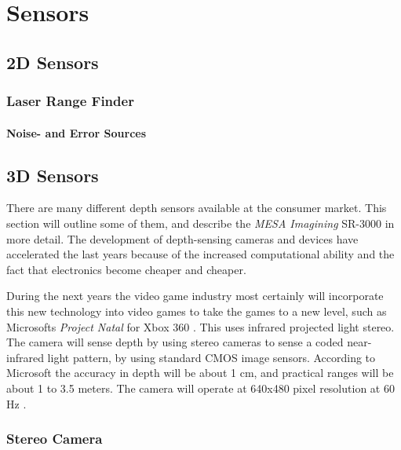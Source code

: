 

\chapter{Sensors}
\label{chap3-sensors}

\section{2D Sensors}

\subsection{Laser Range Finder}


\subsubsection{Noise- and Error Sources}



\section{3D Sensors}
There are many different depth sensors available at the consumer market. This section will
outline some of them, and describe the \emph{MESA Imagining} SR-3000 in more detail.
The development of depth-sensing cameras and devices have accelerated the last years
because of the increased computational ability and the fact that electronics become
cheaper and cheaper. \cite{low-cost-depthcameras}

During the next years the video game industry most certainly will
incorporate this new technology into video games to take the games to a new level, such as
Microsofts \emph{Project Natal} for Xbox 360 \cite{project-natal}. This uses infrared
projected light stereo. The camera will sense depth by using stereo cameras to sense a
coded near-infrared light pattern, by using standard CMOS image sensors. According to
Microsoft the accuracy in depth will be about 1 cm, and practical ranges will be about
1 to 3.5 meters. The camera will operate at 640x480 pixel resolution at 60 Hz
\cite{conceivably-tech}.





\subsection{Stereo Camera}


